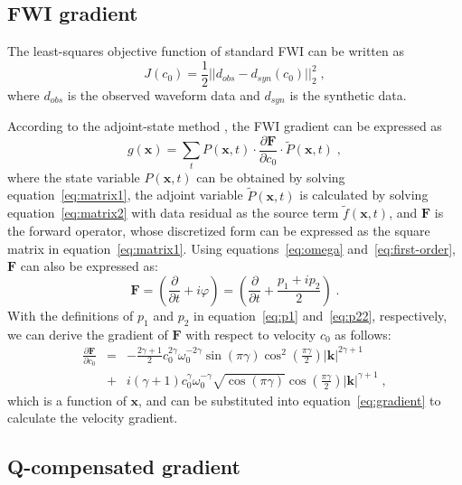 \subsection{FWI gradient}

The least-squares objective function of standard FWI can be written as
\begin{equation}
	\label{eq:objective}
	J(c_0)=\frac{1}{2} || d_{obs}-d_{syn}(c_0)||_2^2 \; ,
\end{equation}
where $d_{obs}$ is the observed waveform data and $d_{syn}$ is the synthetic data.

According to the adjoint-state method \cite[]{tarantola05,plessix06}, the FWI gradient can be expressed as
\begin{equation}
	\label{eq:gradient}
	g(\mathbf{x})=\sum_{t} P(\mathbf{x},t) \cdot \frac{\partial\mathbf{F}}{\partial c_0} \cdot \widetilde{P}(\mathbf{x},t) \; ,
\end{equation}
where the state variable $P(\mathbf{x},t)$ can be obtained by solving equation~\ref{eq:matrix1},
the adjoint variable $\widetilde{P}(\mathbf{x},t)$ is calculated by solving equation~\ref{eq:matrix2}
with data residual as the source term $\widetilde{f}(\mathbf{x}, t)$,
and $\mathbf{F}$ is the forward operator, whose discretized form can be expressed as the square matrix in equation~\ref{eq:matrix1}.
Using equations~\ref{eq:omega} and~\ref{eq:first-order}, $\mathbf{F}$ can also be expressed as:
\begin{equation}
	\label{eq:F}
	\mathbf{F}=\left( \frac{\partial}{\partial t} + i\varphi \right)=\left( \frac{\partial}{\partial t} + \frac{p_1 + ip_2}{2} \right)\; .
\end{equation}
With the definitions of $p_1$ and $p_2$ in equation~\ref{eq:p1} and~\ref{eq:p22}, respectively, we can derive the gradient of $\mathbf{F}$ with respect to
velocity $c_0$ as follows:
\begin{eqnarray}
	\label{eq:partial}
	\frac{\partial\mathbf{F}}{\partial c_0} & = & -\frac{2\gamma+1}{2} c_0^{2\gamma} \omega_0^{-2\gamma} \sin(\pi \gamma) \cos^2 (\frac{\pi\gamma}{2}) |\mathbf{k}|^{2\gamma+1} \nonumber \\
											& + & i(\gamma+1)c_0^{\gamma} \omega_0^{-\gamma} \sqrt{\cos(\pi\gamma)} \cos(\frac{\pi\gamma}{2}) |\mathbf{k}|^{\gamma+1} \; ,
\end{eqnarray}
which is a function of $\mathbf{x}$, and can be substituted into equation~\ref{eq:gradient} to calculate the velocity gradient.

\subsection{Q-compensated gradient}

